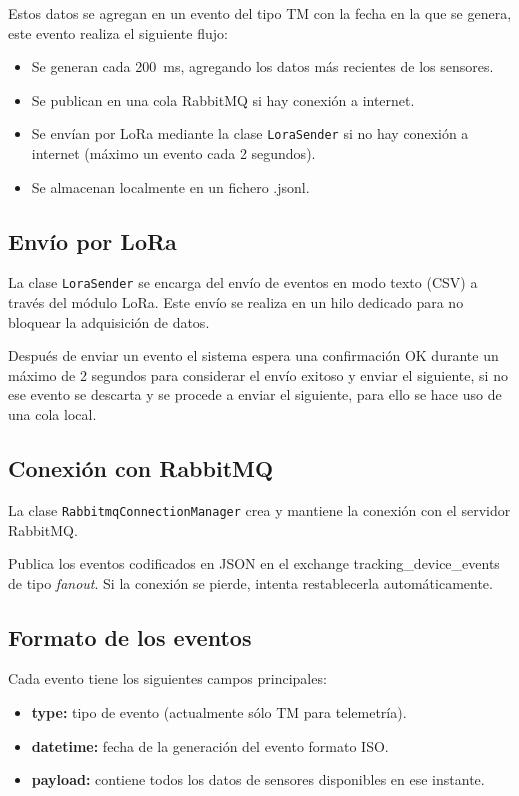 Estos datos se agregan en un evento del tipo TM con la fecha en la que se genera, este evento realiza el siguiente flujo:

\begin{itemize}
    \item Se generan cada 200~ms, agregando los datos más recientes de los sensores.
    \item Se publican en una cola RabbitMQ si hay conexión a internet.
    \item Se envían por LoRa mediante la clase \texttt{LoraSender} si no hay conexión a internet (máximo un evento cada 2 segundos).
    \item Se almacenan localmente en un fichero .jsonl.
\end{itemize}

\subsection{Envío por LoRa}

La clase \texttt{LoraSender} se encarga del envío de eventos en modo texto (CSV) a través del módulo LoRa.
Este envío se realiza en un hilo dedicado para no bloquear la adquisición de datos.

Después de enviar un evento el sistema espera una confirmación OK durante un máximo de 2 segundos para considerar el envío exitoso y enviar el siguiente,
si no ese evento se descarta y se procede a enviar el siguiente, para ello se hace uso de una cola local.

\subsection{Conexión con RabbitMQ}

La clase \texttt{RabbitmqConnectionManager} crea y mantiene la conexión con el servidor RabbitMQ.

Publica los eventos codificados en JSON en el exchange tracking\_device\_events de tipo \emph{fanout}.
Si la conexión se pierde, intenta restablecerla automáticamente.

\subsection{Formato de los eventos}

Cada evento tiene los siguientes campos principales:

\begin{itemize}
    \item \textbf{type:} tipo de evento (actualmente sólo TM para telemetría).
    \item \textbf{datetime:} fecha de la generación del evento formato ISO.
    \item \textbf{payload:} contiene todos los datos de sensores disponibles en ese instante.
\end{itemize}

